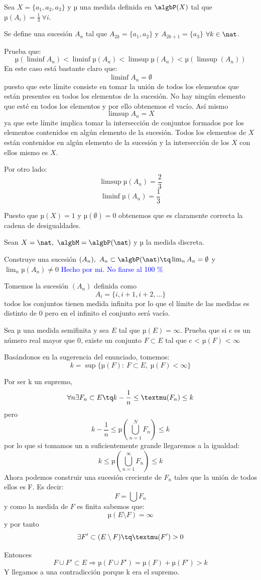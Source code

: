\begin{problem}[7]
Sea $X=\{a_1, a_2, a_3\}$ y µ una medida definida en $\algbP (X)$ tal que $µ(A_i)=\frac{1}{3} \ \forall i$.

Se define una sucesión $A_n$ tal que $A_{2k}=\{a_1, a_2\}$ y $A_{2k+1}=\{a_3\}$ $\forall k \in \nat$.

Prueba que:
\[µ(\liminf A_n) < \liminf µ(A_n) < \limsup µ(A_n) < µ(\limsup(A_n))\]
\solution
En este caso está bastante claro que:
\[\liminf A_n = \emptyset\]
puesto que este límite consiste en tomar la unión de todos los elementos que están presentes en todos los elementos de la sucesión. No hay ningún elemento que esté en todos los elementos y por ello obtenemos el vacío.
Así mismo
\[\limsup A_n = X\]
ya que este límite implica tomar la intersección de conjuntos formados por los elementos contenidos en algún elemento de la sucesión. Todos los elementos de $X$ están contenidos en algún elemento de la sucesión y la intersección de los $X$ con ellos mismo es $X$.

Por otro lado:
\[\limsup µ(A_n) = \frac{2}{3}\]
\[\liminf µ(A_n) = \frac{1}{3}\]

Puesto que $µ(X) =1$ y $µ(\emptyset)=0$ obtenemos que es claramente correcta la cadena de desigualdades.
\end{problem}


\begin{problem}[8]
Sean $X=\nat, \ \algbM=\algbP(\nat)$ y µ la medida discreta.

Construye una sucesión $(A_n), \ A_n\subset \algbP(\nat) \tq \lim_n A_n=\emptyset$ y $\lim_n µ(A_n) \neq 0$
\solution
\textcolor{blue}{Hecho por mi. No fiarse al 100 \%}

Tomemos la sucesión $(A_n)$ definida como
\[A_i = \{i, i+1, i+2,...\}\]
todos los conjuntos tienen medida infinita por lo que el límite de las medidas es distinto de 0 pero en el infinito el conjunto será vacío.
\end{problem}


\begin{problem}[9]
Sea µ una medida semifinita y sea $E$ tal que $µ(E) = \infty$. Prueba que si c es un número real mayor que 0, existe un conjunto $F \subset E$ tal que c < $µ(F)$ < $\infty$

\solution
Basándonos en la sugerencia del enunciado, tomemos:
\[k=\sup \{µ(F): \ F \subset E, \ µ(F)< \infty \}\]

Por ser k un supremo,
\[\forall n \exists F_n \subset E \tq k-\frac{1}{n} \leq µ(F_n) \leq k\]
pero
\[k - \frac{1}{n} \leq µ(\bigcup_{n=1}^{N} F_n) \leq k\]
por lo que si tomamos un n suficientemente grande llegaremos a la igualdad:
\[k \leq µ(\bigcup_{n=1}^{\infty}F_n) \leq k\]
Ahora podemos construir una sucesión creciente de $F_n$ tales que la unión de todos ellos es F. Es decir:
\[F= \bigcup F_n\]
y como la medida de $F$ es finita sabemos que:
\[µ(E \setminus F)= \infty\]
y por tanto
\[\exists F'\subset (E \setminus F) \tq µ(F')> 0\]

Entonces
\[F \cup F' \subset E \Rightarrow µ(F \cup F')=µ(F)+µ(F') > k\]
Y llegamos a una contradicción porque k era el supremo.


\end{problem}

